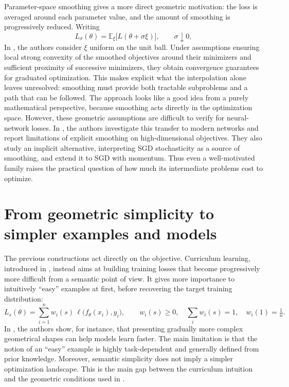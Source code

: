 \documentclass[11pt,a4paper]{article}
\begin{document}
Parameter-space smoothing gives a more direct geometric motivation:
the loss is averaged around each parameter value, and the amount of
smoothing is progressively reduced. Writing
\[
    L_\sigma(\theta)=\mathbb{E}_{\xi}
    \bigl[L(\theta+\sigma\xi)\bigr],
    \qquad \sigma\downarrow0,
\]
In \cite{hazan2016graduated}, the authors consider $\xi$ uniform on the unit
ball. Under assumptions ensuring local strong convexity of the smoothed
objectives around their minimizers and sufficient proximity of successive
minimizers, they obtain convergence guarantees for graduated optimization.
This makes explicit what the interpolation alone leaves unresolved:
smoothing must provide both tractable subproblems and a path that can be
followed. The approach looks like a good idea from a purely mathematical
perspective, because smoothing acts directly in the optimization space.
However, these geometric assumptions are difficult to verify for
neural-network losses. In \cite{sato2025explicit}, the authors investigate
this transfer to modern networks and report limitations of explicit
smoothing on high-dimensional objectives. They also study an implicit
alternative, interpreting SGD stochasticity as a source of smoothing,
and extend it to SGD with momentum. Thus even a well-motivated family
raises the practical question of how much its intermediate problems cost
to optimize.

\section{From geometric simplicity to simpler examples and models}

The previous constructions act directly on the objective. Curriculum
learning, introduced in \cite{bengio2009curriculum}, instead aims at building training
losses that become progressively more difficult from a semantic point of
view. It gives more importance to intuitively ``easy'' examples at first,
before recovering the target training distribution:
\[
    L_s(\theta)=\sum_{i=1}^{n}w_i(s)\,
    \ell\bigl(f_\theta(x_i),y_i\bigr),
    \qquad w_i(s)\geq0,\quad \sum_i w_i(s)=1,\quad w_i(1)=\tfrac1n.
\]
In \cite{bengio2009curriculum}, the authors show, for instance, that
presenting gradually more complex geometrical shapes can help models
learn faster. The main limitation is that the notion of an ``easy''
example is highly task-dependent and generally defined from prior
knowledge. Moreover, semantic simplicity does not imply a simpler
optimization landscape. This is the main gap between the curriculum
intuition and the geometric conditions used in \cite{hazan2016graduated}.
\end{document}

